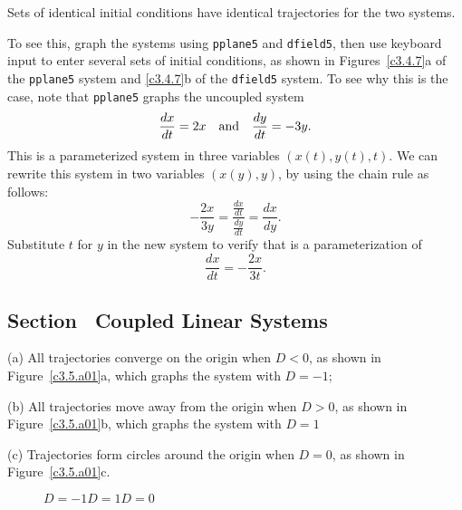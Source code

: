 \documentclass{ximera}
\begin{document}
\ans Sets of identical initial conditions have identical trajectories
for the two systems. 

\soln To see this, graph the systems using {\tt pplane5} and
{\tt dfield5}, then use keyboard input to enter several sets of initial
conditions, as shown in Figures~\ref{c3.4.7}a of the {\tt pplane5} system
and \ref{c3.4.7}b of the {\tt dfield5} system.  To see why this is the case,
note that {\tt pplane5} graphs the uncoupled system
\begin{equation} \label{eq:3.4.7}
\frac{dx}{dt} = 2x \quad\mbox{and}\quad \frac{dy}{dt} = -3y.
\end{equation}
This is a parameterized system in three variables $(x(t),y(t),t)$.
We can rewrite this system in two variables $(x(y),y)$, by using the
chain rule as follows:
\[ -\frac{2x}{3y} = \frac{\frac{dx}{dt}}{\frac{dy}{dt}} = \frac{dx}{dy}. \]
Substitute $t$ for $y$ in the new system to verify that 
is a parameterization of
\[ \frac{dx}{dt} = -\frac{2x}{3t}. \]

\begin{figure}[htb]
			\centerline{%
			}
\end{figure}



\subsection*{Section~\protect{\ref{s:3.5}} Coupled Linear Systems}

(a) All trajectories converge on the origin when $D < 0$, as shown in
Figure~\ref{c3.5.a01}a, which graphs the system with $D =- 1$;

(b) All trajectories move away from the origin when $D > 0$, as shown in
Figure~\ref{c3.5.a01}b, which graphs the system with $D = 1$

(c) Trajectories form circles around the origin when $D = 0$, as shown in
Figure~\ref{c3.5.a01}c.

\begin{figure}[htb]
                       \centerline{%
                       }
	\centerline{$D = -1$\hspace{1.4in}$D = 1$\hspace{1.4in}$D = 0$}
\end{figure}
\end{document}
